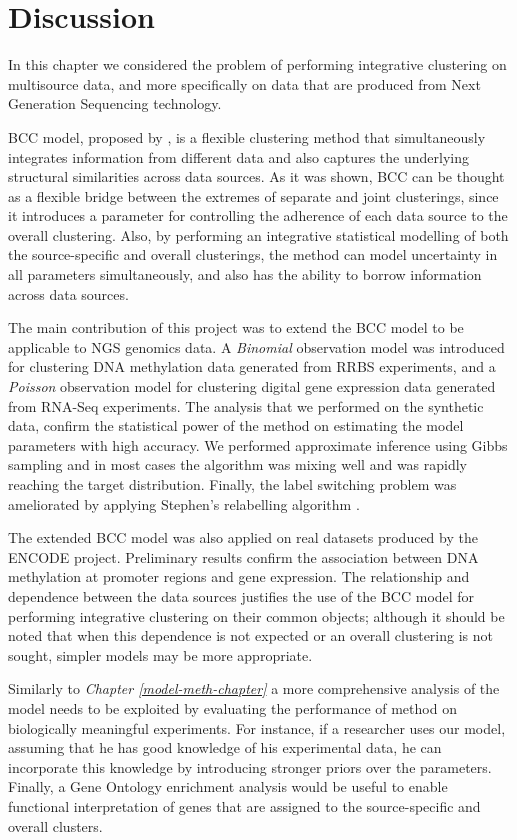 \section{Discussion} \label{integr-discussion-sect}
In this chapter we considered the problem of performing integrative clustering on multisource data, and more specifically on data that are produced from Next Generation Sequencing technology.

BCC model, proposed by \citet{Lock2013}, is a flexible clustering method that simultaneously integrates information from different data and also captures the underlying structural similarities across data sources. As it was shown, BCC can be thought as a flexible bridge between the extremes of separate and joint clusterings, since it introduces a parameter for controlling the adherence of each data source to the overall clustering. Also, by performing an integrative statistical modelling of both the source-specific and overall clusterings, the method can model uncertainty in all parameters simultaneously, and also has the ability to borrow information across data sources.

The main contribution of this project was to extend the BCC model to be applicable to NGS genomics data. A \emph{Binomial} observation model was introduced for clustering DNA methylation data generated from RRBS experiments, and a \emph{Poisson} observation model for clustering digital gene expression data generated from RNA-Seq experiments. The analysis that we performed on the synthetic data, confirm the statistical power of the method on estimating the model parameters with high accuracy. We performed approximate inference using Gibbs sampling and in most cases the algorithm was mixing well and was rapidly reaching the target distribution. Finally, the label switching problem was ameliorated by applying Stephen's relabelling algorithm \citep{Stephens2000}.

The extended BCC model was also applied on real datasets produced by the ENCODE project. Preliminary results confirm the association between DNA methylation at promoter regions and gene expression. The relationship and dependence between the data sources justifies the use of the BCC model for performing integrative clustering on their common objects; although it should be noted that when this dependence is not expected or an overall clustering is not sought, simpler models may be more appropriate. 

Similarly to \emph{Chapter \ref{model-meth-chapter}} a more comprehensive analysis of the model needs to be exploited by evaluating the performance of method on  biologically meaningful experiments. For instance, if a researcher uses our model, assuming that he has good knowledge of his experimental data, he can incorporate this knowledge by introducing stronger priors over the parameters. Finally, a Gene Ontology enrichment analysis would be useful to enable functional interpretation of genes that are assigned to the source-specific and overall clusters.